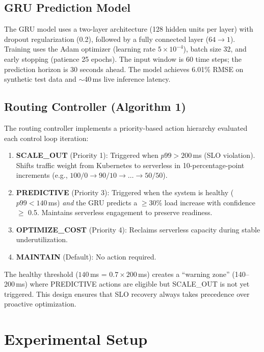 \documentclass[conference,letterpaper]{IEEEtran}
\begin{document}
\subsection{GRU Prediction Model}

The GRU model uses a two-layer architecture (128 hidden units per layer) with dropout regularization (0.2), followed by a fully connected layer ($64 \rightarrow 1$). Training uses the Adam optimizer (learning rate $5 \times 10^{-4}$), batch size 32, and early stopping (patience 25 epochs). The input window is 60 time steps; the prediction horizon is 30 seconds ahead. The model achieves 6.01\% RMSE on synthetic test data and $\sim$40\,ms live inference latency.

\subsection{Routing Controller (Algorithm 1)}

The routing controller implements a priority-based action hierarchy evaluated each control loop iteration:

\begin{enumerate}
    \item \textbf{SCALE\_OUT} (Priority 1): Triggered when $p99 > 200$\,ms (SLO violation). Shifts traffic weight from Kubernetes to serverless in 10-percentage-point increments (e.g., $100/0 \rightarrow 90/10 \rightarrow \ldots \rightarrow 50/50$).
    \item \textbf{PREDICTIVE} (Priority 3): Triggered when the system is healthy ($p99 < 140$\,ms) \textit{and} the GRU predicts a $\geq$30\% load increase with confidence $\geq$ 0.5. Maintains serverless engagement to preserve readiness.
    \item \textbf{OPTIMIZE\_COST} (Priority 4): Reclaims serverless capacity during stable underutilization.
    \item \textbf{MAINTAIN} (Default): No action required.
\end{enumerate}

The healthy threshold ($140$\,ms = $0.7 \times 200$\,ms) creates a ``warning zone'' (140--200\,ms) where PREDICTIVE actions are eligible but SCALE\_OUT is not yet triggered. This design ensures that SLO recovery always takes precedence over proactive optimization.

\section{Experimental Setup}
\end{document}
